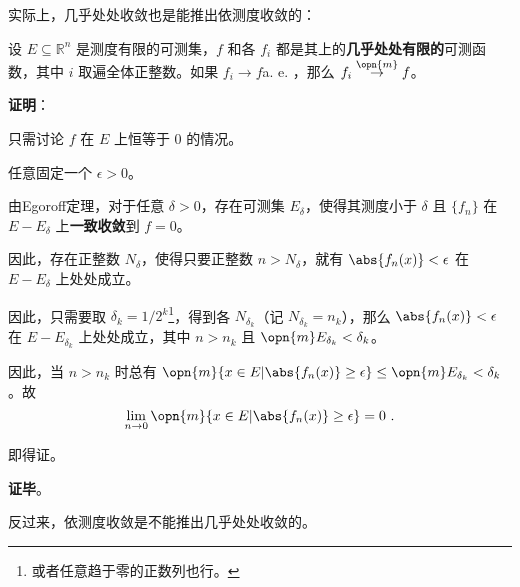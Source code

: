 实际上，几乎处处收敛也是能推出依测度收敛的：

\begin{theorem}{}\label{LimMs_the1}

设 $E\subseteq \mathbb{R}^n$ 是测度有限的可测集，$f$ 和各 $f_i$ 都是其上的\textbf{几乎处处有限的}可测函数，其中 $i$ 取遍全体正整数。如果 $f_i\to f $a. e. ，那么 $f_i\overset{\opn{m}}\to f$。



\end{theorem}

\textbf{证明}：

只需讨论 $f$ 在 $E$ 上恒等于 $0$ 的情况。

任意固定一个 $\epsilon>0$。

由Egoroff定理，对于任意 $\delta>0$，存在可测集 $E_\delta$，使得其测度小于 $\delta$ 且 $\{f_n\}$ 在 $E-E_\delta$ 上\textbf{一致收敛}到 $f=0$。

因此，存在正整数 $N_\delta$，使得只要正整数 $n>N_\delta$，就有 $\abs{f_n(x)}<\epsilon$ 在 $E-E_\delta$ 上处处成立。

因此，只需要取 $\delta_k=1/2^k$\footnote{或者任意趋于零的正数列也行。}，得到各 $N_{\delta_k}$（记 $N_{\delta_k}=n_k$），那么 $\abs{f_{n}(x)}<\epsilon$ 在 $E-E_{\delta_k}$ 上处处成立，其中 $n>n_k$ 且 $\opn{m}E_{\delta_k}<{\delta_k}$。

因此，当 $n>n_k$ 时总有 $\opn{m}\{x\in E|\abs{f_n(x)}\geq\epsilon\}\leq\opn{m}E_{\delta_k}<\delta_k$。故
\begin{equation}
\lim\limits_{n\to 0}\opn{m}\{x\in E|\abs{f_n(x)}\geq\epsilon\}=0~.
\end{equation}

即得证。

\textbf{证毕}。


反过来，依测度收敛是不能推出几乎处处收敛的。

